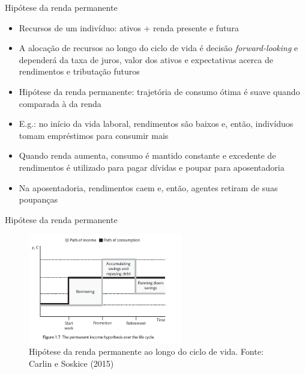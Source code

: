 \documentclass[10pt]{beamer}
\begin{document}
\begin{frame}
    {Hipótese da renda permanente}
    \begin{itemize}
        \item Recursos de um indivíduo: ativos + renda presente e futura\bigskip
        \item A alocação de recursos ao longo do ciclo de vida é decisão \emph{forward-looking} e dependerá da taxa de juros, valor dos ativos e expectativas acerca de rendimentos e tributação futuros\bigskip
        \item Hipótese da renda permanente: trajetória de consumo ótima é suave quando comparada à da renda\bigskip
        \item E.g.: no início da vida laboral, rendimentos são baixos e, então, indivíduos tomam empréstimos para consumir mais\bigskip
        \item Quando renda aumenta, consumo é mantido constante e excedente de rendimentos é utilizado para pagar dívidas e poupar para aposentadoria\bigskip
        \item Na aposentadoria, rendimentos caem e, então, agentes retiram de suas poupanças
    \end{itemize}
\end{frame}

\begin{frame}
    {Hipótese da renda permanente}
    \begin{figure}
        \centering
        \includegraphics[width=0.6\textwidth]{./figures/aula7_fig3.jpg}
        \caption{Hipótese da renda permanente ao longo do ciclo de vida. Fonte: Carlin e Soskice (2015)}
    \end{figure}
\end{frame}
\end{document}
